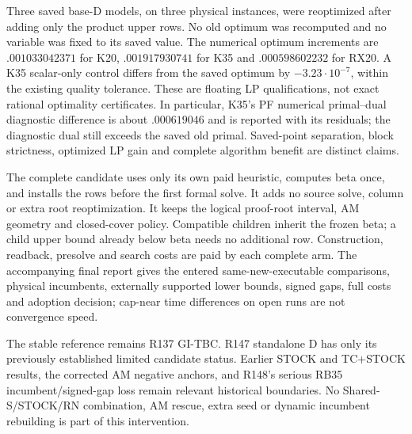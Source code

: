 Three saved base-D models, on three physical instances, were reoptimized
after adding only the product upper rows.  No old optimum was recomputed
and no variable was fixed to its saved value.  The numerical optimum
increments are $.001033042371$ for K20, $.001917930741$ for K35 and
$.000598602232$ for RX20.  A K35 scalar-only control differs from the
saved optimum by $-3.23\cdot10^{-7}$, within the existing quality tolerance.
These are floating LP qualifications, not exact rational optimality
certificates.  In particular, K35's PF numerical primal--dual diagnostic
difference is about $.000619046$ and is reported with its residuals;
the diagnostic dual still exceeds the saved old primal.  Saved-point
separation, block strictness, optimized LP gain and complete algorithm
benefit are distinct claims.

The complete candidate uses only its own paid heuristic, computes beta
once, and installs the rows before the first formal solve.  It adds no
source solve, column or extra root reoptimization.  It keeps the logical
proof-root interval, AM geometry and closed-cover policy.  Compatible
children inherit the frozen beta; a child upper bound already below beta
needs no additional row.  Construction, readback, presolve and search
costs are paid by each complete arm.  The accompanying final report gives
the entered same-new-executable comparisons, physical incumbents,
externally supported lower bounds, signed gaps, full costs and adoption
decision; cap-near time differences on open runs are not convergence speed.

The stable reference remains R137 GI-TBC.  R147 standalone D has only its
previously established limited candidate status.  Earlier STOCK and
TC+STOCK results, the corrected AM negative anchors, and R148's serious
RB35 incumbent/signed-gap loss remain relevant historical boundaries.
No Shared-S/STOCK/RN combination, AM rescue, extra seed or dynamic
incumbent rebuilding is part of this intervention.
